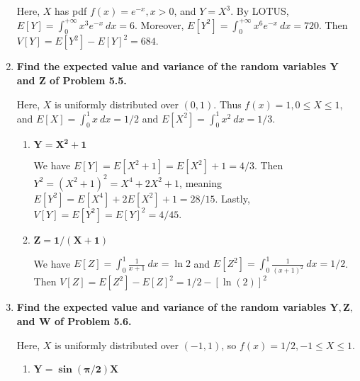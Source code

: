 \documentclass[10pt, oneside]{article}   	%
\theoremstyle{definition}
\begin{document}
\begin{enumerate}[label=7.\arabic*]
  Here, $X$ has pdf $f(x) = e^{-x}, x > 0$, and $Y = X^3$. By LOTUS, $E[Y] = \int^{+\infty}_0 x^3 e^{-x} \ dx = \boxed{6}$. Moreover, $E[Y^2] = \int^{+\infty}_0 x^6 e^{-x} \ dx = 720$. Then $V[Y] = E[Y^2] - E[Y]^2 = \boxed{684}$.
  
\item  \begin{tcolorbox}[
  colback=Cerulean!5!white,
  colframe=Cerulean!75!black]
  \textbf{Find the expected value and variance of the random variables $\bm{Y}$ and $\bm{Z}$ of Problem 5.5.}
  \end{tcolorbox}
  
  Here, $X$ is uniformly distributed over $(0,1)$. Thus $f(x) = 1, 0 \leq X \leq 1$, and $E[X] = \int^1_0 x \ dx = 1/2$ and $E[X^2] = \int^1_0 x^2 \ dx = 1/3$.
  
  	\begin{enumerate}
	\item  \begin{tcolorbox}[
	  colback=Cerulean!5!white,
	  colframe=Cerulean!75!black]
	\textbf{$\bm{Y = X^2 + 1}$}
	\end{tcolorbox}
	
	We have $E[Y] = E[X^2 + 1] = E[X^2] + 1 = \boxed{4/3}$. Then $Y^2 = (X^2 + 1)^2 = X^4 + 2X^2 + 1$, meaning $E[Y^2] = E[X^4] + 2 E[X^2] + 1 = 28/15$. Lastly, $V[Y] = E[Y^2] = E[Y]^2 = \boxed{4/45}$.
	
	\item  \begin{tcolorbox}[
	  colback=Cerulean!5!white,
	  colframe=Cerulean!75!black]
	\textbf{$\bm{Z = 1/(X + 1)}$}
	\end{tcolorbox}	
	
	We have $E[Z] = \int^1_0 \frac{1}{x + 1} \ dx = \boxed{\ln 2}$ and $E[Z^2] = \int^1_0 \frac{1}{(x + 1)^2} \ dx = 1/2$. Then $V[Z] = E[Z^2] - E[Z]^2 = \boxed{1/2 - [\ln(2)]^2}$
	\end{enumerate}
	
\item  \begin{tcolorbox}[
  colback=Cerulean!5!white,
  colframe=Cerulean!75!black]
  \textbf{Find the expected value and variance of the random variables $\bm{Y, Z,}$ and $\bm{W}$ of Problem 5.6.}
  \end{tcolorbox}
  
  Here, $X$ is uniformly distributed over $(-1,1)$, so $f(x) = 1/2, -1 \leq X \leq 1$.
  
  	\begin{enumerate}
	\item  \begin{tcolorbox}[
	  colback=Cerulean!5!white,
	  colframe=Cerulean!75!black]
	\textbf{$\bm{Y = \sin (\pi / 2) X}$}
	\end{tcolorbox}
	

\end{enumerate}
\end{enumerate}
\end{document}
